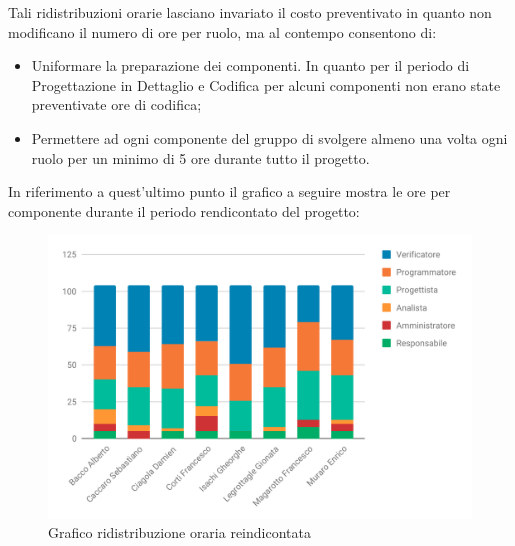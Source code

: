 Tali ridistribuzioni orarie lasciano invariato il costo preventivato in quanto non modificano il numero di ore per ruolo, ma al contempo consentono di:
\begin{itemize}
	\item Uniformare la preparazione dei componenti. In quanto per il periodo di Progettazione in Dettaglio e Codifica per alcuni componenti non erano state preventivate ore di codifica;
	\item Permettere ad ogni componente del gruppo di svolgere almeno una volta ogni ruolo per un minimo di 5 ore durante tutto il progetto. 	
\end{itemize}
In riferimento a quest'ultimo punto il grafico a seguire mostra le ore per componente durante il periodo rendicontato del progetto:
\begin{figure}[H]
\includegraphics[width=1\linewidth]{Consuntivo/grafici/ConsTR1.pdf}
\caption{Grafico ridistribuzione oraria reindicontata}
\end{figure}
